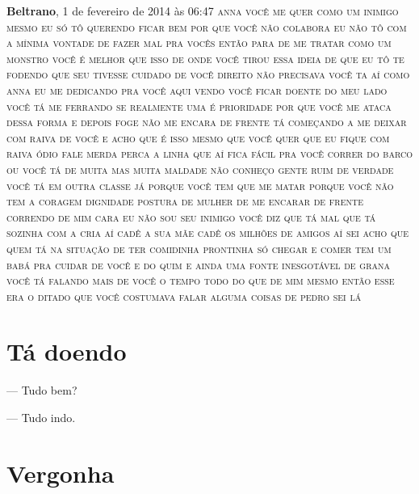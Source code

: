 \textbf{Beltrano}, 1 de fevereiro de 2014 às 06:47 \textsc{anna você me
quer como um inimigo mesmo eu só tô querendo ficar bem por que você não
colabora eu não tô com a mínima vontade de fazer mal pra vocês então
para de me tratar como um monstro você é melhor que isso de onde você
tirou essa ideia de que eu tô te fodendo que seu tivesse cuidado de você
direito não precisava você ta aí como anna eu me dedicando pra você aqui
vendo você ficar doente do meu lado você tá me ferrando se realmente uma
é prioridade por que você me ataca dessa forma e depois foge não me
encara de frente tá começando a me deixar com raiva de você e acho que é
isso mesmo que você quer que eu fique com raiva ódio fale merda perca a
linha que aí fica fácil pra você correr do barco ou você tá de muita mas
muita maldade não conheço gente ruim de verdade você tá em outra classe
já porque você tem que me matar porque você não tem a coragem dignidade
postura de mulher de me encarar de frente correndo de mim cara eu não
sou seu inimigo você diz que tá mal que tá sozinha com a cria aí cadê a
sua mãe cadê os milhões de amigos aí sei acho que quem tá na situação de
ter comidinha prontinha só chegar e comer tem um babá pra cuidar de você
e do quim e ainda uma fonte inesgotável de grana você tá falando mais de
você o tempo todo do que de mim mesmo então esse era o ditado que você
costumava falar alguma coisas de pedro sei lá}

\chapter{Tá doendo}\label{tuxe1-doendo}

--- Tudo bem?

--- Tudo indo.


\chapter{Vergonha}\label{vergonha}

